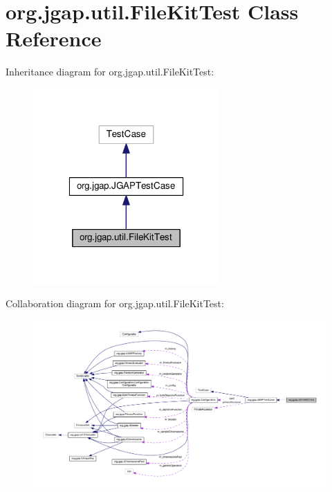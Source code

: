 \hypertarget{classorg_1_1jgap_1_1util_1_1_file_kit_test}{\section{org.\-jgap.\-util.\-File\-Kit\-Test Class Reference}
\label{classorg_1_1jgap_1_1util_1_1_file_kit_test}
}


Inheritance diagram for org.\-jgap.\-util.\-File\-Kit\-Test\-:
\nopagebreak
\begin{figure}[H]
\begin{center}
\leavevmode
\includegraphics[width=202pt]{classorg_1_1jgap_1_1util_1_1_file_kit_test__inherit__graph}
\end{center}
\end{figure}


Collaboration diagram for org.\-jgap.\-util.\-File\-Kit\-Test\-:
\nopagebreak
\begin{figure}[H]
\begin{center}
\leavevmode
\includegraphics[width=350pt]{classorg_1_1jgap_1_1util_1_1_file_kit_test__coll__graph}
\end{center}
\end{figure}
